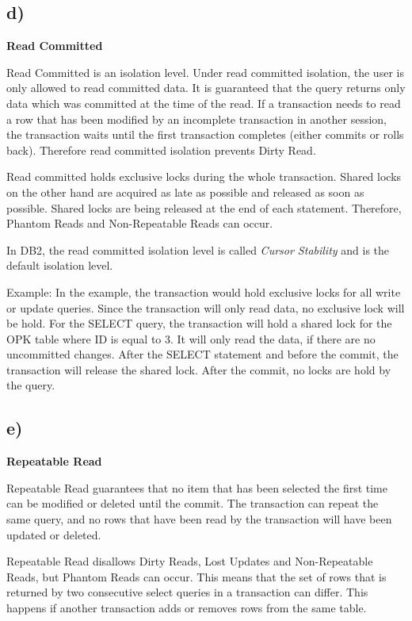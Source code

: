 \documentclass[ngerman]{dis-template-add}
\begin{document}
\subsection*{d)}

\textbf{Read Committed}

Read Committed is an isolation level.
Under read committed isolation, the user is only allowed to read committed data.
It is guaranteed that the query returns only data which was committed at the time of the read.
If a transaction needs to read a row that has been modified by an incomplete transaction in another session, the transaction waits until the first transaction completes (either commits or rolls back).
Therefore read committed isolation prevents Dirty Read.

Read committed holds exclusive locks during the whole transaction.
Shared locks on the other hand are acquired as late as possible and released as soon as possible. Shared locks are being released at the end of each statement.
Therefore, Phantom Reads and Non-Repeatable Reads can occur.

In DB2, the read committed isolation level is called \textit{Cursor Stability} and is the default isolation level.

Example:
In the example, the transaction would hold exclusive locks for all write or update queries. Since the transaction will only read data, no exclusive lock will be hold.
For the SELECT query, the transaction will hold a shared lock for the OPK table where ID is equal to 3. It will only read the data, if there are no uncommitted changes.
After the SELECT statement and before the commit, the transaction will release the shared lock.
After the commit, no locks are hold by the query.


\subsection*{e)}

\textbf{Repeatable Read}

Repeatable Read guarantees that no item that has been selected the first time can be modified or deleted until the commit.
The transaction can repeat the same query, and no rows that have been read by the transaction will have been updated or deleted.

Repeatable Read disallows Dirty Reads, Lost Updates and Non-Repeatable Reads, but Phantom Reads can occur.
This means that the set of rows that is returned by two consecutive select queries in a transaction can differ. This happens if another transaction adds or removes rows from the same table.
\end{document}
